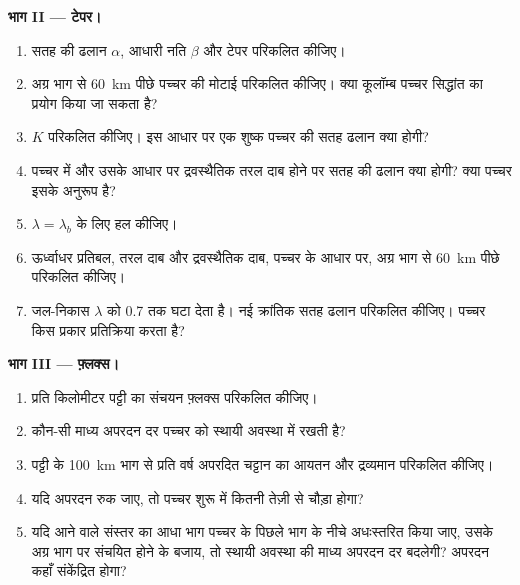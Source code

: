 \begin{problem}
\medskip\noindent\textbf{भाग II --- टेपर।}
\begin{enumerate}[resume]
  \item सतह की ढलान $\alpha$, आधारी नति $\beta$ और
        टेपर परिकलित कीजिए।
  \item अग्र भाग से \qty{60}{km} पीछे पच्चर की मोटाई परिकलित कीजिए। क्या
        कूलॉम्ब पच्चर सिद्धांत का प्रयोग किया जा सकता है?
  \item $K$ परिकलित कीजिए। इस आधार पर एक शुष्क पच्चर की सतह ढलान क्या होगी?
  \item पच्चर में और उसके आधार पर द्रवस्थैतिक तरल दाब होने पर
        सतह की ढलान क्या होगी? क्या पच्चर इसके अनुरूप है?
  \item $\lambda = \lambda_b$ के लिए  हल कीजिए।
  \item ऊर्ध्वाधर प्रतिबल, तरल दाब और द्रवस्थैतिक
        दाब, पच्चर के आधार पर, अग्र भाग से \qty{60}{km} पीछे परिकलित कीजिए।
  \item जल-निकास $\lambda$ को 0.7 तक घटा देता है। नई क्रांतिक सतह
        ढलान परिकलित कीजिए। पच्चर किस प्रकार प्रतिक्रिया करता है?
\end{enumerate}

\medskip\noindent\textbf{भाग III --- फ़्लक्स।}
\begin{enumerate}[resume]
  \item प्रति किलोमीटर पट्टी का संचयन फ़्लक्स परिकलित कीजिए।
  \item कौन-सी माध्य अपरदन दर पच्चर को स्थायी अवस्था में रखती है?
  \item पट्टी के \qty{100}{km} भाग से प्रति वर्ष अपरदित चट्टान का आयतन
        और द्रव्यमान परिकलित कीजिए।
  \item यदि अपरदन रुक जाए, तो पच्चर शुरू में कितनी तेज़ी से चौड़ा होगा?
  \item यदि आने वाले संस्तर का आधा भाग पच्चर के पिछले भाग के नीचे
        अधःस्तरित किया जाए, उसके अग्र भाग पर संचयित होने के बजाय, तो
        स्थायी अवस्था की माध्य अपरदन दर बदलेगी? अपरदन कहाँ संकेंद्रित होगा?
\end{enumerate}


\end{problem}
